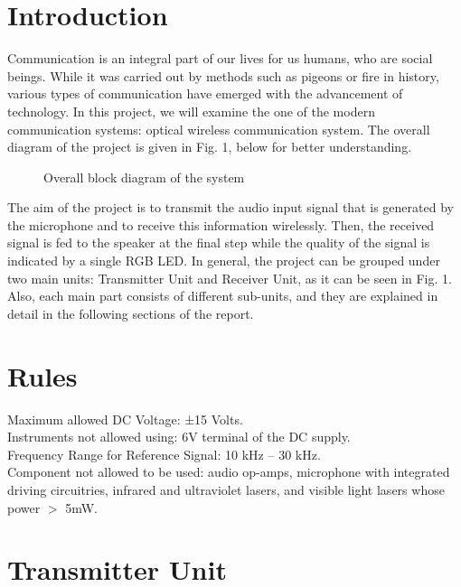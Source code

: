 \documentclass[conference]{IEEEtran}
\begin{document}
\section{Introduction}
Communication is an integral part of our lives for us humans, who are social beings. While it was carried out by methods such as pigeons or fire in history, various types of communication have emerged with the advancement of technology. In this project, we will examine the one of the modern communication systems: optical wireless communication system. The overall diagram of the project is given in Fig. 1, below for better understanding.
\begin{figure}[H]
   \centerline{}
    \caption{Overall block diagram of the system}
\end{figure}
 \par The aim of the project is to transmit the audio input signal that is generated by the microphone and to receive this information wirelessly. Then, the received signal is fed to the speaker at the final step while the quality of the signal is indicated by a single RGB LED. In general, the project can be grouped under two main units: Transmitter Unit and Receiver Unit, as it can be seen in Fig. 1. Also, each main part consists of different sub-units, and they are explained in detail in the following sections of the report.
\section{Rules}
\noindent Maximum allowed DC Voltage: ±15 Volts. \\
Instruments not allowed using: 6V terminal of the DC supply.\\ 
Frequency Range for Reference Signal: 10 kHz – 30 kHz. \\
Component not allowed to be used: audio op-amps, microphone with integrated driving circuitries, infrared and ultraviolet lasers, and visible light lasers whose power \(>\) 5mW.
\section{Transmitter Unit}
\end{document}
